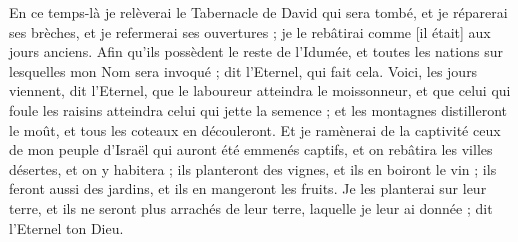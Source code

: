 \begin{multicols}{2}
En ce temps-là je relèverai le Tabernacle de David qui sera tombé, et je réparerai ses brèches, et je refermerai ses ouvertures ; je le rebâtirai comme [il était] aux jours anciens.
Afin qu'ils possèdent le reste de l'Idumée, et toutes les nations sur lesquelles mon Nom sera invoqué ; dit l'Eternel, qui fait cela.
Voici, les jours viennent, dit l'Eternel, que le laboureur atteindra le moissonneur, et que celui qui foule les raisins atteindra celui qui jette la semence ; et les montagnes distilleront le moût, et tous les coteaux en découleront.
Et je ramènerai de la captivité ceux de mon peuple d'Israël qui auront été emmenés captifs, et on rebâtira les villes désertes, et on y habitera ; ils planteront des vignes, et ils en boiront le vin ; ils feront aussi des jardins, et ils en mangeront les fruits.
Je les planterai sur leur terre, et ils ne seront plus arrachés de leur terre, laquelle je leur ai donnée ; dit l'Eternel ton Dieu.
\PPE{}
\end{multicols}
